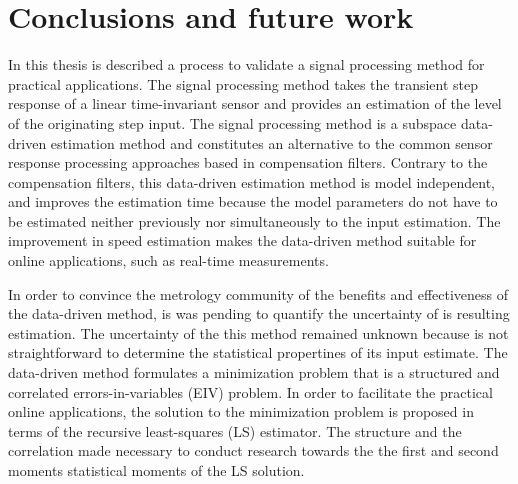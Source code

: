 \glsresetall

\chapter[Conclusions and future work]{Conclusions and \linebreak future work} \label{chap:concl}

\vfill{}



In this thesis is described a process to validate a signal processing method for practical applications.
The signal processing method takes the transient step response of a linear time-invariant sensor and provides an estimation of the level of the originating step input.
The signal processing method is a subspace data-driven estimation method and constitutes an alternative to the common sensor response processing approaches based in compensation filters.
Contrary to the compensation filters, this data-driven estimation method is model independent, and improves the estimation time because the model parameters do not have to be estimated neither previously nor simultaneously to the input estimation.
The improvement in speed estimation makes the data-driven method suitable for online applications, such as real-time measurements.


In order to convince the metrology community of the benefits and effectiveness of the data-driven method, is was pending to quantify the uncertainty of is resulting estimation.
The uncertainty of the this method remained unknown because is not straightforward to determine the statistical propertines of its input estimate.
The data-driven method formulates a minimization problem that is a structured and correlated errors-in-variables (EIV) problem.
In order to facilitate the practical online applications, the solution to the minimization problem is proposed in terms of the recursive least-squares (LS) estimator.
The structure and the correlation made necessary to conduct research towards the the first and second moments statistical moments of the LS solution.


